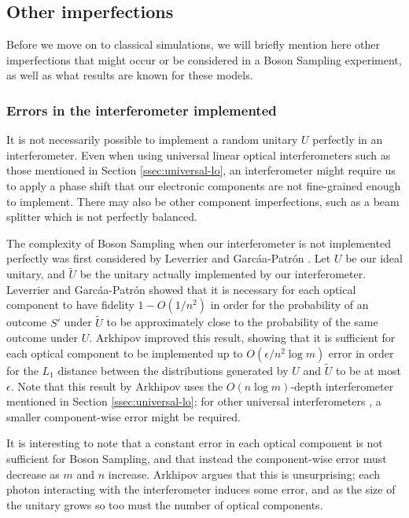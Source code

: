 \subsection{Other imperfections}

Before we move on to classical simulations, we will briefly mention here other imperfections that might occur or be considered in a Boson Sampling experiment, as well as what results are known for these models.

\subsubsection{Errors in the interferometer implemented}

It is not necessarily possible to implement a random unitary $U$ perfectly in an interferometer. Even when using universal linear optical interferometers such as those mentioned in Section \ref{ssec:universal-lo}, an interferometer might require us to apply a phase shift that our electronic components are not fine-grained enough to implement. There may also be other component imperfections, such as a beam splitter which is not perfectly balanced.

The complexity of Boson Sampling when our interferometer is not implemented perfectly was first considered by Leverrier and Garc\'{a}a-Patr\'{o}n \cite{leverrier2015}. Let $U$ be our ideal unitary, and $\tilde{U}$ be the unitary actually implemented by our interferometer. Leverrier and Garc\'{a}a-Patr\'{o}n showed that it is necessary for each optical component to have fidelity $1-O(1/n^2)$ in order for the probability of an outcome $S'$ under $\tilde{U}$ to be approximately close to the probability of the same outcome under $U$. Arkhipov \cite{arkhipov2015} improved this result, showing that it is sufficient for each optical component to be implemented up to $O(\epsilon/n^2\log m)$ error in order for the $L_1$ distance between the distributions generated by $U$ and $\tilde{U}$ to be at most $\epsilon$. Note that this result by Arkhipov uses the $O(n\log m)$-depth interferometer mentioned in Section \ref{ssec:universal-lo}; for other universal interferometers \cite{hurwitz1897, reck1994, clements2016}, a smaller component-wise error might be required.

It is interesting to note that a constant error in each optical component is not sufficient for Boson Sampling, and that instead the component-wise error must decrease as $m$ and $n$ increase. Arkhipov argues that this is unsurprising; each photon interacting with the interferometer induces some error, and as the size of the unitary grows so too must the number of optical components.

